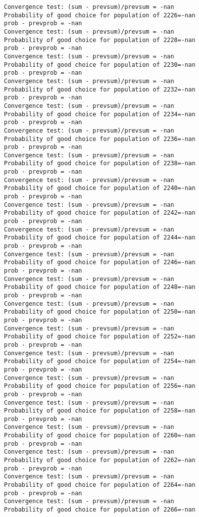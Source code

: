 \documentclass[11pt,onecolumn]{article}
\begin{document}
\begin{verbatim}
Convergence test: (sum - prevsum)/prevsum = -nan
Probability of good choice for population of 2226=-nan
prob - prevprob = -nan
Convergence test: (sum - prevsum)/prevsum = -nan
Probability of good choice for population of 2228=-nan
prob - prevprob = -nan
Convergence test: (sum - prevsum)/prevsum = -nan
Probability of good choice for population of 2230=-nan
prob - prevprob = -nan
Convergence test: (sum - prevsum)/prevsum = -nan
Probability of good choice for population of 2232=-nan
prob - prevprob = -nan
Convergence test: (sum - prevsum)/prevsum = -nan
Probability of good choice for population of 2234=-nan
prob - prevprob = -nan
Convergence test: (sum - prevsum)/prevsum = -nan
Probability of good choice for population of 2236=-nan
prob - prevprob = -nan
Convergence test: (sum - prevsum)/prevsum = -nan
Probability of good choice for population of 2238=-nan
prob - prevprob = -nan
Convergence test: (sum - prevsum)/prevsum = -nan
Probability of good choice for population of 2240=-nan
prob - prevprob = -nan
Convergence test: (sum - prevsum)/prevsum = -nan
Probability of good choice for population of 2242=-nan
prob - prevprob = -nan
Convergence test: (sum - prevsum)/prevsum = -nan
Probability of good choice for population of 2244=-nan
prob - prevprob = -nan
Convergence test: (sum - prevsum)/prevsum = -nan
Probability of good choice for population of 2246=-nan
prob - prevprob = -nan
Convergence test: (sum - prevsum)/prevsum = -nan
Probability of good choice for population of 2248=-nan
prob - prevprob = -nan
Convergence test: (sum - prevsum)/prevsum = -nan
Probability of good choice for population of 2250=-nan
prob - prevprob = -nan
Convergence test: (sum - prevsum)/prevsum = -nan
Probability of good choice for population of 2252=-nan
prob - prevprob = -nan
Convergence test: (sum - prevsum)/prevsum = -nan
Probability of good choice for population of 2254=-nan
prob - prevprob = -nan
Convergence test: (sum - prevsum)/prevsum = -nan
Probability of good choice for population of 2256=-nan
prob - prevprob = -nan
Convergence test: (sum - prevsum)/prevsum = -nan
Probability of good choice for population of 2258=-nan
prob - prevprob = -nan
Convergence test: (sum - prevsum)/prevsum = -nan
Probability of good choice for population of 2260=-nan
prob - prevprob = -nan
Convergence test: (sum - prevsum)/prevsum = -nan
Probability of good choice for population of 2262=-nan
prob - prevprob = -nan
Convergence test: (sum - prevsum)/prevsum = -nan
Probability of good choice for population of 2264=-nan
prob - prevprob = -nan
Convergence test: (sum - prevsum)/prevsum = -nan
Probability of good choice for population of 2266=-nan

\end{verbatim}
\end{document}
